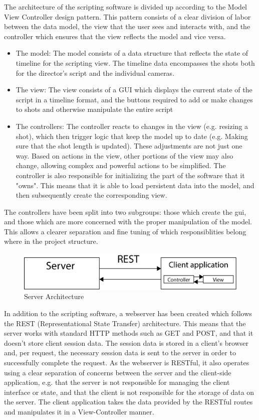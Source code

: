 \documentclass[11pt,twoside,a4paper]{article}
\begin{document}
The architecture of the scripting software is divided up according to the Model View Controller design pattern. This pattern consists of a clear division of labor between the data model, the view that the user sees and interacts with, and the controller which ensures that the view reflects the model and vice versa.
\begin{itemize}
    \item The model: The model consists of a data structure that reflects the state of timeline for the scripting view. The timeline data encompasses the shots both for the director's script and the individual cameras.
    \item The view: The view consists of a GUI which displays the current state of the script in a timeline format, and the buttons required to add or make changes to shots and otherwise manipulate the entire script
    \item The controllers: The controller reacts to changes in the view (e.g. resizing a shot), which then trigger logic that keep the model up to date (e.g. Making sure that the shot length is updated). These adjustments are not just one way. Based on actions in the view, other portions of the view may also change, allowing complex and powerful actions to be simplified. The controller is also responsible for initializing the part of the software that it "owns". This means that it is able to load persistent data into the model, and then subsequently create the corresponding view.
\end{itemize}
The controllers have been split into two subgroups: those which create the gui, and those which are more concerned with the proper manipulation of the model. This allows a clearer separation and fine tuning of which responsiblities belong where in the project structure.\\
\begin{figure}[H]
	\centering
	\includegraphics[width=\textwidth]{server-decomposition}
	\caption{Server Architecture}
	\label{fig:serverdecomp}
\end{figure}
In addition to the scripting software, a webserver has been created which follows the REST (Representational State Transfer) architecture. This means that the server works with standard HTTP methods such as GET and POST, and that it doesn't store client session data. The session data is stored in a client's browser and, per request, the necessary session data is sent to the server in order to successfully complete the request. As the webserver is RESTful, it also operates using a clear separation of concerns between the server and the client-side application, e.g. that the server is not responsible for managing the client interface or state, and that the client is not responsible for the storage of data on the server. The client application takes the data provided by the RESTful routes and manipulates it in a View-Controller manner.
\end{document}
